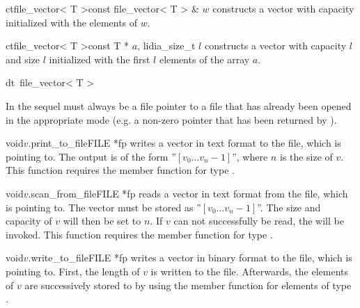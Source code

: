 \begin{fcode}{ct}{file_vector< T >}{const file_vector< T > & $w$}
  constructs a vector with capacity  initialized with the elements of $w$.
\end{fcode}

\begin{fcode}{ct}{file_vector< T >}{const T * $a$, lidia_size_t $l$}
  constructs a vector with capacity $l$ and size $l$ initialized with the first $l$ elements of
  the array $a$.
\end{fcode}

\begin{fcode}{dt}{~file_vector< T >}{}
\end{fcode}



\IO

In the sequel  must always be a file pointer to a file that has already been opened in the
appropriate mode (e.g. a non-zero pointer that has been returned by ).

\begin{cfcode}{void}{$v$.print_to_file}{FILE *fp}
  writes a vector in text format to the file, which  is pointing to.  The output is of the
  form ''$[ v_0 \dots v_n-1 ]$'', where $n$ is the size of $v$.  This function requires the
  member function  for type .
\end{cfcode}

\begin{fcode}{void}{$v$.scan_from_file}{FILE *fp}
  reads a vector in text format from the file, which  is pointing to.  The vector must be
  stored as ''$[ v_0 \dots v_n-1 ]$''.  The size and capacity of $v$ will then be set to $n$.  If
  $v$ can not successfully be read, the \LEH will be invoked.  This function requires the member
  function  for type .
\end{fcode}

\begin{cfcode}{void}{$v$.write_to_file}{FILE *fp}
  writes a vector in binary format to the file, which  is pointing to.  First, the length of
  $v$ is written to the file.  Afterwards, the elements of $v$ are successively stored to  by
  using the member function  for elements of type .
\end{cfcode}

